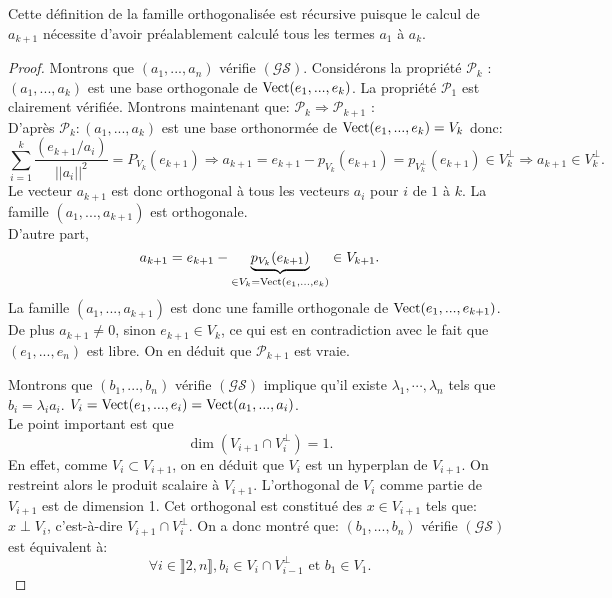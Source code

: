 \begin{rem}
Cette définition de la famille orthogonalisée est récursive puisque le calcul de $a_{k+1}$ nécessite d'avoir préalablement calculé tous les termes $a_1$ à $a_k$.
\end{rem}
\begin{proof}
Montrons que $(a_1, ..., a_n)$ vérifie $(\mathcal{GS})$. Considérons la propriété $\mathcal{P}_{k}$ : $(a_1, ..., a_k)$ est une base orthogonale de $\mathop{\mathrm{Vect}}(e_1, ..., e_k)$.\newline
La propriété $\mathcal{P}_{1}$ est clairement vérifiée. Montrons maintenant que: $\mathcal{P}_{k} \Rightarrow \mathcal{P}_{k+1}$ :\\
D'après $\mathcal{P}_{k} : (a_1, ..., a_k)$ est une base orthonormée de $\mathop{\mathrm{Vect}}(e_1, ..., e_k) = V_k$ donc:
\begin{displaymath}
 \sum_{i=1}^{k} \frac{ (e_{k+1}/a_i) }{ ||a_i||^2 } = P_{V_k} (e_{k+1})  \Rightarrow 
a_{k+1} = e_{k+1} - p_{V_{k}}(e_{k+1}) = p_{V_{k}^{\perp}}( e_{k+1} ) \in V_{k}^{\perp} \Rightarrow
a_{k+1} \in V_{k}^{\perp} .
\end{displaymath}
Le vecteur $a_{k+1}$ est donc orthogonal à tous les vecteurs $a_i$ pour $i$ de $1$ à $k$. La famille $(a_1, ..., a_{k+1})$ est orthogonale.\\
D'autre part, 
\begin{displaymath}
a_{k+1} = e_{k+1} - \underset{\in V_k = \mathop{\mathrm{Vect}}(e_1, ..., e_k)}{\underbrace{p_{V_{k}}(e_{k+1})}} \in V_{k+1} .
\end{displaymath}
La famille $(a_1, ..., a_{k+1})$ est donc une famille orthogonale de $\mathop{\mathrm{Vect}}(e_1, ..., e_{k+1})$. De plus $a_{k+1} \neq 0$, sinon $e_{k+1} \in V_{k}$, ce qui est en contradiction avec le fait que $(e_1, ..., e_n)$ est libre. On en déduit que $\mathcal{P}_{k+1}$ est vraie.

Montrons que $(b_1, ..., b_n)$ vérifie $(\mathcal{GS})$ implique qu'il existe $\lambda_1,\cdots, \lambda_n$ tels que $b_i = \lambda_i a_i$. $V_i = \mathop{\mathrm{Vect}}(e_1, ..., e_i) = \mathop{\mathrm{Vect}}(a_1, ..., a_i)$.\\
Le point important est que
\begin{displaymath}
\dim \left( V_{i+1} \cap V_{i}^{\perp}\right) = 1 .
\end{displaymath}
En effet, comme $V_i \subset V_{i+1}$, on en déduit que $V_{i}$ est un hyperplan de $V_{i+1}$. On restreint alors le produit scalaire à $V_{i+1}$. L'orthogonal de $V_i$ comme partie de $V_{i+1}$ est de dimension 1. Cet orthogonal est constitué des $x \in V_{i+1}$ tels que: $x \perp V_i$, c'est-à-dire $V_{i+1} \cap V_{i}^{\perp}$.
On a donc montré que: $(b_1, ..., b_n)$ vérifie $(\mathcal{GS})$ est équivalent à:
\begin{displaymath}
\forall i \in \rrbracket 2, n \rrbracket, b_i \in V_{i} \cap V_{i-1}^{\perp} \text{ et } b_1 \in V_1.
\end{displaymath}
\end{proof}
